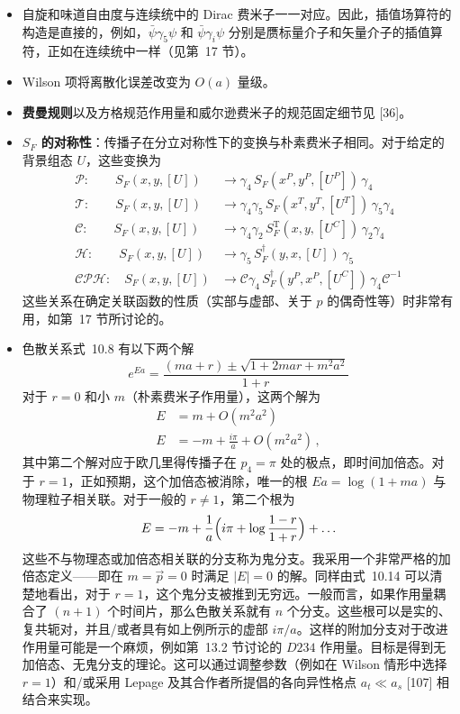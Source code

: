 \begin{itemize}
\item 自旋和味道自由度与连续统中的 Dirac 费米子一一对应。因此，插值场算符的构造是直接的，例如，$\bar\psi \gamma_5 \psi$ 和 $\bar \psi \gamma_i \psi$ 分别是赝标量介子和矢量介子的插值算符，正如在连续统中一样（见第~17 节）。

\item Wilson 项将离散化误差改变为 $O(a)$ 量级。

\item \textbf{费曼规则}以及方格规范作用量和威尔逊费米子的规范固定细节见 [36]。

\item \textbf{$S_F$ 的对称性}：传播子在分立对称性下的变换与朴素费米子相同。对于给定的背景组态 $U$，这些变换为
\begin{align}
\mathcal{P}: \qquad S_F(x,y,[U]) &\to \gamma_4\,S_F(x^P,y^P,[U^P])\,\gamma_4 \nonumber\\
\mathcal{T}: \qquad S_F(x,y,[U]) &\to \gamma_4\gamma_5\,S_F(x^T,y^T,[U^T])\,\gamma_5\gamma_4 \nonumber\\
\mathcal{C}: \qquad S_F(x,y,[U]) &\to \gamma_4\gamma_2\,S_F^{\mathrm{T}}(x,y,[U^C])\,\gamma_2\gamma_4 \nonumber\\
\mathcal{H}: \qquad S_F(x,y,[U]) &\to \gamma_5\,S_F^\dagger(y,x,[U])\,\gamma_5 \nonumber\\
\mathcal{CPH}: \quad S_F(x,y,[U]) &\to \mathcal{C}\gamma_4\,S_F^\dagger(y^P,x^P,[U^C])\,\gamma_4\mathcal{C}^{-1}
\end{align}
这些关系在确定关联函数的性质（实部与虚部、关于 $p$ 的偶奇性等）时非常有用，如第~17 节所讨论的。

\item 色散关系式~10.8 有以下两个解
\begin{equation}
e^{Ea} = \frac{(ma + r) \pm \sqrt{1 + 2mar + m^2 a^2}}{1+r}
\end{equation}
对于 $r = 0$ 和小 $m$（朴素费米子作用量），这两个解为
\begin{align}
E &= m + O(m^2 a^2) \nonumber\\
E &= -m + \frac{i\pi}{a} + O(m^2 a^2) \,,
\end{align}
其中第二个解对应于欧几里得传播子在 $p_4 = \pi$ 处的极点，即时间加倍态。对于 $r = 1$，正如预期，这个加倍态被消除，唯一的根 $Ea = \log(1 + ma)$ 与物理粒子相关联。对于一般的 $r \neq 1$，第二个根为
\begin{equation}
E = -m + \frac{1}{a} \Bigl( i\pi + \log \frac{1-r}{1+r} \Bigr) + \ldots
\end{equation}
这些不与物理态或加倍态相关联的分支称为鬼分支。我采用一个非常严格的加倍态定义——即在 $m = \vec{p} = 0$ 时满足 $|E| = 0$ 的解。同样由式~10.14 可以清楚地看出，对于 $r = 1$，这个鬼分支被推到无穷远。一般而言，如果作用量耦合了 $(n+1)$ 个时间片，那么色散关系就有 $n$ 个分支。这些根可以是实的、复共轭对，并且/或者具有如上例所示的虚部 $i\pi/a$。这样的附加分支对于改进作用量可能是一个麻烦，例如第~13.2 节讨论的 $D234$ 作用量。目标是得到无加倍态、无鬼分支的理论。这可以通过调整参数（例如在 Wilson 情形中选择 $r = 1$）和/或采用 Lepage 及其合作者所提倡的各向异性格点 $a_t \ll a_s$ [107] 相结合来实现。


\end{itemize}
